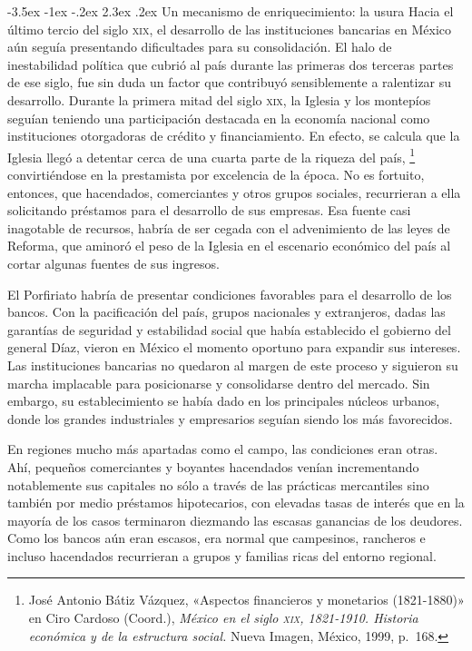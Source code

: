\documentclass[14pt,twoside,final]{extbook} %
\makeatletter
\let\oldfootnote\footnote
\renewcommand\footnote[1]{%
\oldfootnote{\hspace{1mm}#1}}
\renewcommand\section{\@startsection {section}{1}{\z@}%
                                     {-3.5ex \@plus -1ex \@minus -.2ex}%
                                     {2.3ex \@plus .2ex}%
                                     {\normalfont\large\bfseries\sc}}
\makeatother
\begin{document}
\section{Un mecanismo de enriquecimiento: la usura}
\label{sec:usura}
Hacia el último tercio del siglo \textsc{xix}, el desarrollo de las instituciones bancarias en México aún seguía presentando dificultades para su consolidación. El halo de inestabilidad política que cubrió al país durante las primeras dos terceras partes de ese siglo, fue sin duda un factor que contribuyó sensiblemente a ralentizar su desarrollo. Durante la primera mitad del siglo \textsc{xix}, la Iglesia y los montepíos seguían teniendo una participación destacada en la economía nacional como instituciones otorgadoras de crédito y financiamiento. En efecto, se calcula que la Iglesia llegó a detentar cerca de una cuarta parte de la riqueza del país,\footnote{José Antonio Bátiz Vázquez, «Aspectos financieros y monetarios (1821-1880)» en Ciro Cardoso (Coord.), \emph{México en el siglo \textsc{xix}, 1821-1910. Historia económica y de la estructura social.} Nueva Imagen, México, 1999, p.~168.} convirtiéndose en la prestamista por excelencia de la época. No es fortuito, entonces, que hacendados, comerciantes y otros grupos sociales, recurrieran a ella solicitando préstamos para el desarrollo de sus empresas. Esa fuente casi inagotable de recursos, habría de ser cegada con el advenimiento de las leyes de Reforma, que aminoró el peso de la Iglesia en el escenario económico del país al cortar algunas fuentes de sus ingresos.

El Porfiriato habría de presentar condiciones favorables para el desarrollo de los bancos. Con la pacificación del país, grupos nacionales y extranjeros, dadas las garantías de seguridad y estabilidad social que había establecido el gobierno del general Díaz, vieron en México el momento oportuno para expandir sus intereses. Las instituciones bancarias no quedaron al margen de este proceso y siguieron su marcha implacable para posicionarse y consolidarse dentro del mercado. Sin embargo, su establecimiento se había dado en los principales núcleos urbanos, donde los grandes industriales y empresarios seguían siendo los más favorecidos.

En regiones mucho más apartadas como el campo, las condiciones eran otras. Ahí, pequeños comerciantes y boyantes hacendados venían incrementando notablemente sus capitales no sólo a través de las prácticas mercantiles sino también por medio préstamos hipotecarios, con elevadas tasas de interés que en la mayoría de los casos terminaron diezmando las escasas ganancias de los deudores. Como los
bancos aún eran escasos, era normal que campesinos, rancheros e incluso hacendados recurrieran a grupos y familias ricas del entorno regional.
\end{document}
